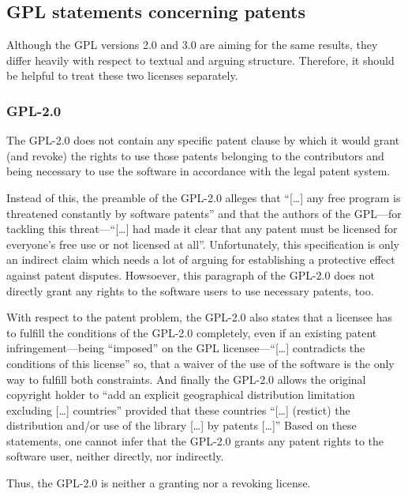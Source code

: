 \subsection{GPL statements concerning patents}

Although the GPL versions 2.0 and 3.0 are aiming for the same results, they
differ heavily with respect to textual and arguing structure. Therefore, it
should be helpful to treat these two licenses separately.

\subsubsection{GPL-2.0}\label{subsec:Gpl20PatentClause}

The GPL-2.0 does not contain any specific patent clause by which it would grant
(and revoke) the rights to use those patents belonging to the contributors and 
being necessary to use the software in accordance with the legal patent system.

Instead of this, the preamble of the GPL-2.0 alleges that \enquote{[\ldots] any
free program is threatened constantly by software patents} and that the authors
of the GPL---for tackling this threat---\enquote{[\ldots] had made it clear
that any patent must be licensed for everyone's free use or not licensed at
all}. Unfortunately, this specification is only an indirect
claim which needs a lot of arguing for establishing a protective effect against
patent disputes. Howsoever, this paragraph of the GPL-2.0 does not directly
grant any rights to the software users to use necessary patents, too.

With respect to the patent problem, the GPL-2.0 also states that a licensee has
to fulfill the conditions of the GPL-2.0 completely, even if an existing patent
infringement---being \enquote{imposed} on the GPL licensee---\enquote{[\ldots]
contradicts the conditions of this license} so, that a waiver of the use of the
software is the only way to fulfill both constraints. And
finally the GPL-2.0 allows the original copyright holder to \enquote{add an
explicit geographical distribution limitation excluding [\ldots] countries}
provided that these countries \enquote{[\ldots] (restict) the distribution
and/or use of the library [\ldots] by patents [\ldots]}
Based on these statements, one cannot infer that the GPL-2.0 grants any patent
rights to the software user, neither directly, nor indirectly.

Thus, the GPL-2.0 is neither a granting nor a revoking license.

